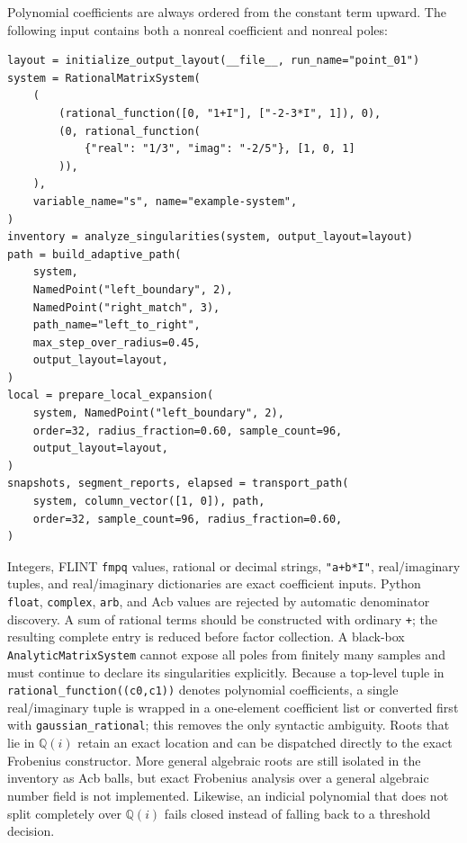 \documentclass[11pt]{article}
\begin{document}
Polynomial coefficients are always ordered from the constant term upward.  The following
input contains both a nonreal coefficient and nonreal poles:
\begin{verbatim}
layout = initialize_output_layout(__file__, run_name="point_01")
system = RationalMatrixSystem(
    (
        (rational_function([0, "1+I"], ["-2-3*I", 1]), 0),
        (0, rational_function(
            {"real": "1/3", "imag": "-2/5"}, [1, 0, 1]
        )),
    ),
    variable_name="s", name="example-system",
)
inventory = analyze_singularities(system, output_layout=layout)
path = build_adaptive_path(
    system,
    NamedPoint("left_boundary", 2),
    NamedPoint("right_match", 3),
    path_name="left_to_right",
    max_step_over_radius=0.45,
    output_layout=layout,
)
local = prepare_local_expansion(
    system, NamedPoint("left_boundary", 2),
    order=32, radius_fraction=0.60, sample_count=96,
    output_layout=layout,
)
snapshots, segment_reports, elapsed = transport_path(
    system, column_vector([1, 0]), path,
    order=32, sample_count=96, radius_fraction=0.60,
)
\end{verbatim}
Integers, FLINT \texttt{fmpq} values, rational or decimal strings, \texttt{"a+b*I"},
real/imaginary tuples, and real/imaginary dictionaries are exact coefficient inputs.  Python
\texttt{float}, \texttt{complex}, \texttt{arb}, and Acb values are rejected by automatic
denominator discovery.  A sum of rational terms should be constructed with ordinary
\texttt{+}; the resulting complete entry is reduced before factor collection.  A black-box
\texttt{AnalyticMatrixSystem} cannot expose all poles from finitely many samples and must
continue to declare its singularities explicitly.
Because a top-level tuple in \texttt{rational\_function((c0,c1))} denotes polynomial
coefficients, a single real/imaginary tuple is wrapped in a one-element coefficient list or
converted first with \texttt{gaussian\_rational}; this removes the only syntactic ambiguity.
Roots that lie in $\mathbb Q(i)$ retain an exact location and can be dispatched directly to
the exact Frobenius constructor.  More general algebraic roots are still isolated in the
inventory as Acb balls, but exact Frobenius analysis over a general algebraic number field is
not implemented.  Likewise, an indicial polynomial that does not split completely over
$\mathbb Q(i)$ fails closed instead of falling back to a threshold decision.
\end{document}
